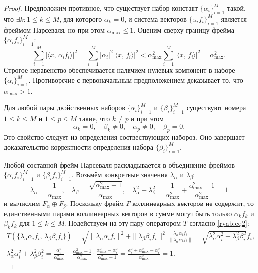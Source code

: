 \begin{proof}
Предположим противное, что существует набор констант $\{\alpha_i\}_{i=1}^M$ такой, что $\exists k: 1 \leq k \leq M$, для которого
$\alpha_k = 0$, и система векторов $\{\alpha_i f_i\}_{i=1}^M$ является фреймом Парсеваля, но при этом $\alpha_{\max} \leq 1$.
Оценим сверху границу фрейма $\{\alpha_i f_i\}_{i=1}^M$:
$$
\sum_{i=1}^M \left| \langle  x,\, \alpha_i f_i \rangle \right|^2 = \sum_{i=1}^M | \alpha_i |^2 \left| \langle  x,\, f_i \rangle \right|^2
< \alpha_{\max}^2 \sum_{i=1}^M \left| \langle  x,\, f_i \rangle \right|^2 = \alpha_{\max}^2.
$$
Строгое неравенство обеспечивается наличием нулевых компонент в наборе $\{\alpha_i\}_{i=1}^M$.
Противоречие с первоначальным предположением доказывает то, что $\alpha_{\max} > 1$.

Для любой пары двойственных наборов $\{\alpha_i\}_{i=1}^M$ и $\{\beta_i\}_{i=1}^M$ существуют номера
$1 \leq k \leq M$ и $1 \leq p \leq M$ такие, что $k \neq p$ и при этом
$$
\alpha_k = 0, \quad \beta_k \neq 0,  \quad \alpha_p \neq 0, \quad \beta_p = 0.
$$
Это свойство следует из определения соотвествующих наборов. Оно завершает доказательство корректности определения набора
$\{\beta_i\}_{i=1}^M$.

Любой составной фрейм Парсеваля раскладывается в объединение фреймов $\{\alpha_i f_i\}_{i=1}^M$ и
$\{\beta_i f_i\}_{i=1}^M$. Возьмём конкретные значения $\lambda_{\alpha}$ и $\lambda_{\beta}$:
$$
\lambda_{\alpha} = \frac{1}{\alpha_{\max}}, \quad
\lambda_{\beta} = \frac{\sqrt{\alpha_{\max}^2 - 1}}{\alpha_{\max}}, \quad
\lambda_{\alpha}^2 + \lambda_{\beta}^2 = \frac{1}{\alpha_{\max}^2} + \frac{\alpha_{\max}^2 - 1}{\alpha_{\max}^2} = 1
$$
и вычислим $F_\alpha \oplus F_\beta$. Поскольку фрейм $F$ коллинеарных векторов не содержит, то единственными
парами коллинеарных векторов в сумме могут быть только $\alpha_k f_k$ и $\beta_k f_k$ для $1 \leq k \leq M$.
Подействуем на эту пару оператором $T$ согласно \eqref{ryab:eq2}:
\begin{gather*}
T \left(\{ \lambda_{\alpha} \alpha_i f_i,\, \lambda_{\beta} \beta_i f_i \}\right) =
\sqrt{\|\lambda_{\alpha} \alpha_i f_i\|^2 + \|\lambda_{\beta} \beta_i f_i\|^2}
\frac{\lambda_{\alpha} \alpha_i f_i}{\|\lambda_{\alpha} \alpha_i f_i\|}
= \sqrt{\lambda_{\alpha}^2 \alpha_i^2  + \lambda_{\beta}^2 \beta_i^2} f_i,\\
\lambda_{\alpha}^2 \alpha_i^2  + \lambda_{\beta}^2 \beta_i^2 =
\frac{\alpha_i^2}{\alpha_{\max}^2} +
\frac{\alpha_{\max}^2 - 1}{\alpha_{\max}^2} \cdot \frac{\alpha_{\max}^2 - \alpha_i^2}{\alpha_{\max}^2 - 1} =
\frac{\alpha_i^2 + \alpha_{\max}^2 - \alpha_i^2}{\alpha_{\max}^2} = 1.
\end{gather*}


\end{proof}
